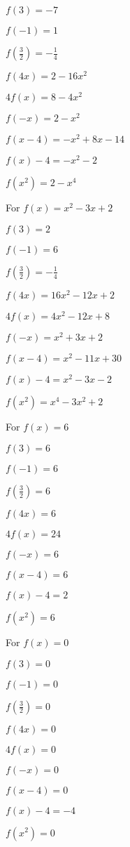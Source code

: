 \begin{exenum}
\begin{shortitemize}
\item $f(3) = -7$
\item $f(-1) = 1$
\item $f\left(\frac{3}{2} \right) = -\frac{1}{4}$
\item  $f(4x) = 2-16x^2$
\item $4f(x) = 8-4x^2$
\item $f(-x) = 2-x^2$
\item  $f(x-4) = -x^2+8x-14$
\item $f(x) - 4 = -x^{2} - 2$
\item  $f\left(x^2\right) = 2-x^4$
\end{shortitemize}

\item For $f(x) = x^2 - 3x + 2$ 

\begin{shortitemize}
\item $f(3) = 2$
\item $f(-1) = 6$
\item $f\left(\frac{3}{2} \right) = -\frac{1}{4}$
\item  $f(4x) = 16x^2-12x+2$
\item $4f(x) = 4x^2-12x+8$
\item $f(-x) = x^2+3x+2$
\item  $f(x-4) = x^2-11x+30$
\item $f(x) - 4 = x^2-3x-2$
\item  $f\left(x^2\right) = x^4-3x^2+2$
\end{shortitemize}

\item For $f(x) = 6$ 

\begin{shortitemize}
\item $f(3) = 6$
\item $f(-1) =6$
\item $f\left(\frac{3}{2} \right) = 6$
\item  $f(4x) = 6$
\item $4f(x) = 24$
\item $f(-x) = 6$
\item  $f(x-4) = 6$ 
\item $f(x) - 4 = 2$
\item  $f\left(x^2\right) = 6$
\end{shortitemize}

\item For $f(x) = 0$ 

\begin{shortitemize}
\item $f(3) = 0$
\item $f(-1) =0$
\item $f\left(\frac{3}{2} \right) = 0$
\item  $f(4x) = 0$
\item $4f(x) = 0$
\item $f(-x) = 0$
\item  $f(x-4) = 0$ 
\item $f(x) - 4 = -4$
\item  $f\left(x^2\right) = 0$
\end{shortitemize}


\end{exenum}
